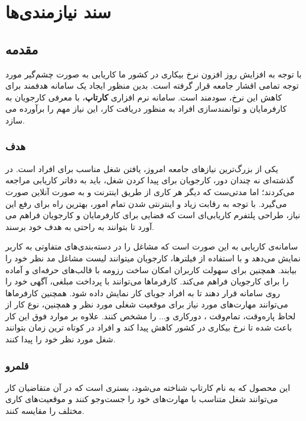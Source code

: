 \documentclass[12pt,svgnames,oneside]{book}
\begin{document}
	\renewcommand{\bibname}{مراجع}
    
    \frontmatter
	\tableofcontents
	\mainmatter

	\chapter{سند نیازمندی‌ها}
		\section{مقدمه}
			با توجه به افزایش روز افزون نرخ بیکاری در کشور ما کاریابی به صورت چشم‌گیر مورد توجه تمامی اقشار جامعه قرار گرفته است. بدین منظور ایجاد یک سامانه هدفمند برای کاهش این نرخ، سودمند است. سامانه نرم افزاری \textbf{کارتاپ}، با معرفی کارجویان به کارفرمایان و توانمندسازی افراد به منظور دریافت کار، این نیاز مهم را برآورده می سازد.
			\subsection{هدف}
				یکی از بزرگ‌ترین نیازهای جامعه امروز، یافتن شغل مناسب برای افراد است. در گذشته‌ای نه چندان دور، کارجویان برای پیدا کردن شغل، باید به دفاتر کاریابی مراجعه می‌کردند؛ اما مدتی‌ست که دیگر هر کاری از طریق اینترنت و به صورت آنلاین صورت می‌گیرد. با توجه به رقابت زیاد و اینترنتی شدن تمام امور، بهترین راه برای رفع این نیاز، طراحی پلتفرم کاریابی‌‌ای است که فضایی برای کارفرمایان و کارجویان فراهم می آورد تا بتوانند به راحتی به هدف خود برسند.

				سامانه‌ی کاریابی به این صورت است که مشاغل را در دسته‌بندی‌های متفاوتی به کاربر نمایش می‌دهد و با استفاده از فیلترها، کارجویان میتوانند لیست مشاغل مد نظر خود را بیابند. همچنین برای سهولت کاربران امکان ساخت رزومه با قالب‌های حرفه‌ای و آماده را برای کارجویان فراهم می‌کند. کارفرما‌ها می‌توانند با پرداخت مبلغی، آگهی خود را روی سامانه قرار دهند تا به افراد جویای کار نمایش داده شود. همچنین کارفرماها می‌توانند مهارت‌های مورد نیاز برای موقعیت شغلی مورد نظر و همچنین، نوع کار از لحاظ پاره‌وقت، تمام‌وقت ، دورکاری و... را مشخص کنند.
				علاوه بر موارد فوق این کار باعث شده تا نرخ بیکاری در کشور کاهش پیدا کند و افراد در کوتاه ترین زمان بتوانند شغل مورد نظر خود را پیدا کنند.

			\subsection{قلمرو}
				این محصول که به نام کارتاپ شناخته می‌شود، بستری است که در آن متقاضیان کار می‌توانند شغل متناسب با مهارت‌های خود را جست‌وجو کنند و موقعیت‌های کاری مختلف را مقایسه کنند.
\end{document}
